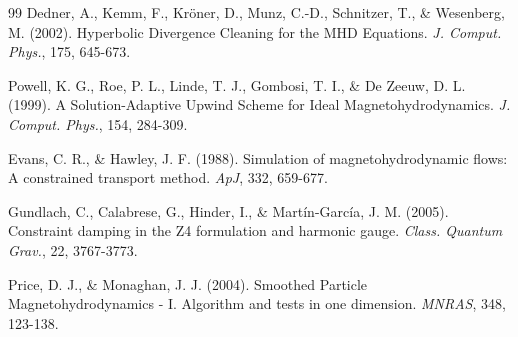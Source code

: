 \documentclass[12pt,a4paper]{article}
\begin{document}
\begin{thebibliography}{99}
 Dedner, A., Kemm, F., Kr\"oner, D., Munz, C.-D., Schnitzer, T., \& Wesenberg, M. (2002).
Hyperbolic Divergence Cleaning for the MHD Equations.
\textit{J. Comput. Phys.}, 175, 645-673.

 Powell, K. G., Roe, P. L., Linde, T. J., Gombosi, T. I., \& De Zeeuw, D. L. (1999).
A Solution-Adaptive Upwind Scheme for Ideal Magnetohydrodynamics.
\textit{J. Comput. Phys.}, 154, 284-309.

 Evans, C. R., \& Hawley, J. F. (1988).
Simulation of magnetohydrodynamic flows: A constrained transport method.
\textit{ApJ}, 332, 659-677.

 Gundlach, C., Calabrese, G., Hinder, I., \& Mart\'in-Garc\'ia, J. M. (2005).
Constraint damping in the Z4 formulation and harmonic gauge.
\textit{Class. Quantum Grav.}, 22, 3767-3773.

 Price, D. J., \& Monaghan, J. J. (2004).
Smoothed Particle Magnetohydrodynamics - I. Algorithm and tests in one dimension.
\textit{MNRAS}, 348, 123-138.

\end{thebibliography}
\end{document}
